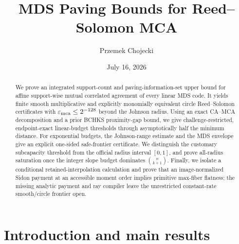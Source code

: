 \documentclass[11pt,a4paper]{amsart}
\title{MDS Paving Bounds for Reed--Solomon MCA}
\author{Przemek Chojecki}
\date{July 16, 2026}
\numberwithin{equation}{section}
\theoremstyle{remark}
\begin{document}
\raggedbottom

\begin{abstract}
We prove an integrated support-count and paving-information-set upper bound for affine support-wise mutual correlated agreement of every linear MDS code.  It yields finite smooth multiplicative and explicitly monomially equivalent circle Reed--Solomon certificates with \(\varepsilon_{\rm mca}\le2^{-128}\) beyond the Johnson radius.  Using an exact CA--MCA decomposition and a prior BCHKS proximity-gap bound, we give challenge-restricted, endpoint-exact linear-budget thresholds through asymptotically half the minimum distance.  For exponential budgets, the Johnson-range estimate and the MDS envelope give an explicit one-sided safe-frontier certificate.  We distinguish the customary subcapacity threshold from the official radius interval \([0,1]\), and prove all-radius saturation once the integer slope budget dominates \(\binom n{k+1}\).  Finally, we isolate a conditional retained-interpolation calculation and prove that an image-normalized Sidon payment at an accessible moment order implies primitive max-fiber flatness; the missing analytic payment and ray compiler leave the unrestricted constant-rate smooth/circle frontier open.
\end{abstract}

\maketitle
\setcounter{tocdepth}{1}
\tableofcontents
\clearpage

\section{Introduction and main results}\label{sec:introduction}
\end{document}
